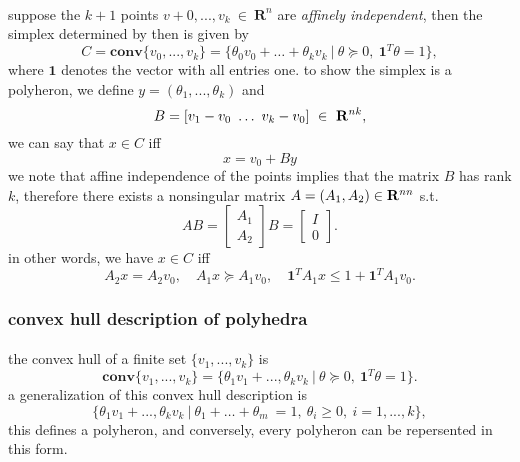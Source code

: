 \documentclass{article}
\begin{document}
      \paragraph{} suppose the $k + 1$ points $v+0, ..., v_k\ \in\ \mathbf{R}^n$ are \textit{affinely independent}, then the simplex determined by then is given by
      \begin{equation}
        C = \mathbf{conv}\{v_0,...,v_k\} = \{\theta_0v_0 +\dots+\theta_kv_k\ |\ \theta \succeq 0,\ \mathbf{1}^T\theta = 1\},
      \end{equation}
      where $\mathbf{1}$ denotes the vector with all entries one. to show the simplex is a polyheron, we define $y = (\theta_1,...,\theta_k)$ and
      \begin{equation}
        B = [v_1 - v_0\ \dots\ v_k - v_0]\ \in\ \mathbf{R}^{n\*k},
      \end{equation}
      we can say that $x \in C$ iff
      \begin{equation}
        x = v_0 + By
      \end{equation}
      we note that affine independence of the points implies that the matrix $B$ has rank $k$, therefore there exists a nonsingular matrix $A = (A_1,A_2)\in\mathbf{R}^{n\*n}$ s.t.
      \begin{equation}
        AB =
        \begin{bmatrix}
          A_1 \\
          A_2
        \end{bmatrix}
        B =
        \begin{bmatrix}
          I \\
          0
        \end{bmatrix}.
      \end{equation}
      in other words, we have $x \in C$ iff
      \begin{equation}
        A_2x = A_2v_0,\quad A_1x \succeq A_1v_0,\quad \mathbf{1}^TA_1x \leq 1 + \mathbf{1}^TA_1v_0.
      \end{equation}
    \subsubsection{convex hull description of polyhedra}
      \paragraph{} the convex hull of a finite set $\{v_1,...,v_k\}$ is
      \begin{equation}
        \mathbf{conv}\{v_1,...,v_k\} = \{\theta_1v_1+...,\theta_kv_k\ |\ \theta \succeq 0,\ \mathbf{1}^T\theta = 1\}.
      \end{equation}
      a generalization of this convex hull description is
      \begin{equation}
        \{\theta_1v_1+...,\theta_kv_k\ |\ \theta_1+\dots+\theta_m\ = 1,\ \theta_i \ge 0,\ i = 1,...,k\},
      \end{equation}
      this defines a polyheron, and conversely, every polyheron can be repersented in this form.
\end{document}
